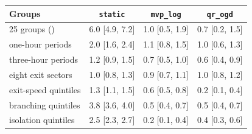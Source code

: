 \setlength{\tabcolsep}{3.0pt}
\begin{tabular}{@{}lccc@{}}
\toprule
Groups & \texttt{static} & \texttt{mvp\_log} & \texttt{qr\_ogd} \\
\midrule
25 groups (\Dbar{}) & 6.0 [4.9, 7.2] & 1.0 [0.5, 1.9] & 0.7 [0.2, 1.5] \\
\addlinespace[2pt]
one-hour periods & 2.0 [1.6, 2.4] & 1.1 [0.8, 1.5] & 1.0 [0.6, 1.3] \\
three-hour periods & 1.2 [0.9, 1.5] & 0.7 [0.5, 1.0] & 0.6 [0.4, 0.9] \\
eight exit sectors & 1.0 [0.8, 1.3] & 0.9 [0.7, 1.1] & 1.0 [0.8, 1.2] \\
exit-speed quintiles & 1.3 [1.1, 1.5] & 0.6 [0.5, 0.8] & 0.2 [0.1, 0.4] \\
branching quintiles & 3.8 [3.6, 4.0] & 0.5 [0.4, 0.7] & 0.5 [0.4, 0.7] \\
isolation quintiles & 2.5 [2.3, 2.7] & 0.2 [0.1, 0.4] & 0.4 [0.3, 0.6] \\
\bottomrule
\end{tabular}
